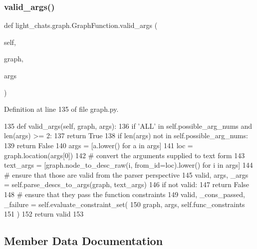 \subsubsection{\texorpdfstring{valid\+\_\+args()}{valid\_args()}}
{\footnotesize\ttfamily def light\+\_\+chats.\+graph.\+Graph\+Function.\+valid\+\_\+args (\begin{DoxyParamCaption}\item[{}]{self,  }\item[{}]{graph,  }\item[{}]{args }\end{DoxyParamCaption})}



Definition at line 135 of file graph.\+py.


\begin{DoxyCode}
135     \textcolor{keyword}{def }valid\_args(self, graph, args):
136         \textcolor{keywordflow}{if} \textcolor{stringliteral}{'ALL'} \textcolor{keywordflow}{in} self.possible\_arg\_nums \textcolor{keywordflow}{and} len(args) >= 2:
137             \textcolor{keywordflow}{return} \textcolor{keyword}{True}
138         \textcolor{keywordflow}{if} len(args) \textcolor{keywordflow}{not} \textcolor{keywordflow}{in} self.possible\_arg\_nums:
139             \textcolor{keywordflow}{return} \textcolor{keyword}{False}
140         args = [a.lower() \textcolor{keywordflow}{for} a \textcolor{keywordflow}{in} args]
141         loc = graph.location(args[0])
142         \textcolor{comment}{# convert the arguments supplied to text form}
143         text\_args = [graph.node\_to\_desc\_raw(i, from\_id=loc).lower() \textcolor{keywordflow}{for} i \textcolor{keywordflow}{in} args]
144         \textcolor{comment}{# ensure that those are valid from the parser perspective}
145         valid, args, \_args = self.parse\_descs\_to\_args(graph, text\_args)
146         \textcolor{keywordflow}{if} \textcolor{keywordflow}{not} valid:
147             \textcolor{keywordflow}{return} \textcolor{keyword}{False}
148         \textcolor{comment}{# ensure that they pass the function constraints}
149         valid, \_cons\_passed, \_failure = self.evaluate\_constraint\_set(
150             graph, args, self.func\_constraints
151         )
152         \textcolor{keywordflow}{return} valid
153 
\end{DoxyCode}


\subsection{Member Data Documentation}
\mbox{\label{classlight__chats_1_1graph_1_1GraphFunction_a88e5637deee00b7f2f5d682afea0e85d}} 
